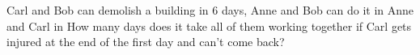 Carl and Bob can demolish a building in 6 days, Anne and Bob can do it in  Anne and Carl in   How many days does it take all of them working together if Carl gets injured at the end of the first day and can't come back?
